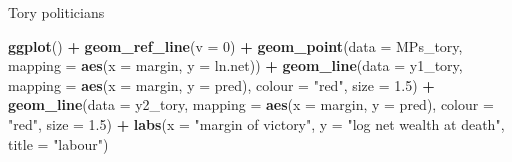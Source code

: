 \documentclass[]{book}
\newenvironment{Shaded}{\begin{snugshade}}{\end{snugshade}}
\newcommand{\DataTypeTok}[1]{\textcolor[rgb]{0.13,0.29,0.53}{#1}}
\newcommand{\DecValTok}[1]{\textcolor[rgb]{0.00,0.00,0.81}{#1}}
\newcommand{\FloatTok}[1]{\textcolor[rgb]{0.00,0.00,0.81}{#1}}
\newcommand{\KeywordTok}[1]{\textcolor[rgb]{0.13,0.29,0.53}{\textbf{#1}}}
\newcommand{\NormalTok}[1]{#1}
\newcommand{\OperatorTok}[1]{\textcolor[rgb]{0.81,0.36,0.00}{\textbf{#1}}}
\newcommand{\StringTok}[1]{\textcolor[rgb]{0.31,0.60,0.02}{#1}}
\theoremstyle{definition}
\theoremstyle{definition}
\theoremstyle{definition}
\theoremstyle{remark}
\begin{document}
\begin{Shaded}
\end{Shaded}

Tory politicians

\begin{Shaded}
\begin{Highlighting}[]
\KeywordTok{ggplot}\NormalTok{() }\OperatorTok{+}
\StringTok{  }\KeywordTok{geom_ref_line}\NormalTok{(}\DataTypeTok{v =} \DecValTok{0}\NormalTok{) }\OperatorTok{+}
\StringTok{  }\KeywordTok{geom_point}\NormalTok{(}\DataTypeTok{data =}\NormalTok{ MPs_tory,}
             \DataTypeTok{mapping =} \KeywordTok{aes}\NormalTok{(}\DataTypeTok{x =}\NormalTok{ margin, }\DataTypeTok{y =}\NormalTok{ ln.net)) }\OperatorTok{+}
\StringTok{  }\KeywordTok{geom_line}\NormalTok{(}\DataTypeTok{data =}\NormalTok{ y1_tory,}
            \DataTypeTok{mapping =} \KeywordTok{aes}\NormalTok{(}\DataTypeTok{x =}\NormalTok{ margin, }\DataTypeTok{y =}\NormalTok{ pred), }\DataTypeTok{colour =} \StringTok{"red"}\NormalTok{, }\DataTypeTok{size =} \FloatTok{1.5}\NormalTok{) }\OperatorTok{+}
\StringTok{  }\KeywordTok{geom_line}\NormalTok{(}\DataTypeTok{data =}\NormalTok{ y2_tory,}
            \DataTypeTok{mapping =} \KeywordTok{aes}\NormalTok{(}\DataTypeTok{x =}\NormalTok{ margin, }\DataTypeTok{y =}\NormalTok{ pred), }\DataTypeTok{colour =} \StringTok{"red"}\NormalTok{, }\DataTypeTok{size =} \FloatTok{1.5}\NormalTok{) }\OperatorTok{+}
\StringTok{  }\KeywordTok{labs}\NormalTok{(}\DataTypeTok{x =} \StringTok{"margin of victory"}\NormalTok{, }\DataTypeTok{y =} \StringTok{"log net wealth at death"}\NormalTok{,}
       \DataTypeTok{title =} \StringTok{"labour"}\NormalTok{)}
\end{Highlighting}
\end{Shaded}
\end{document}
